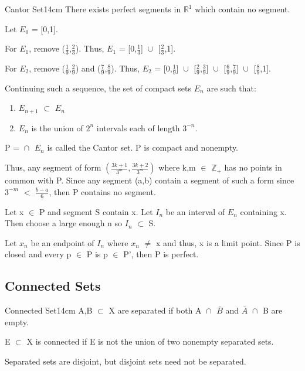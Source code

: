 	\begin{definition}{Cantor Set}{14cm}
		There exists perfect segments in $\mathbb{R}^1$ which contain no segment.

		Let $E_0$ = [0,1].

		For $E_1$, remove ($\frac{1}{3}$,$\frac{2}{3}$).
		Thus, $E_1$ = [0,$\frac{1}{3}$] $\cup_{}^{}$ [$\frac{2}{3}$,1].

		For $E_2$, remove ($\frac{1}{9}$,$\frac{2}{9}$) and ($\frac{7}{9}$,$\frac{8}{9}$).
		Thus, $E_2$ = [0,$\frac{1}{9}$] $\cup_{}^{}$ [$\frac{2}{9}$,$\frac{3}{9}$] $\cup_{}^{}$
		[$\frac{6}{9}$,$\frac{7}{9}$] $\cup_{}^{}$ [$\frac{8}{9}$,1].

		Continuing such a sequence, the set of compact sets $E_n$ are such that:

		\begin{enumerate}[label=(\alph*), leftmargin=2cm, itemsep=0.1cm]
			\item $E_{n+1}$ $\subset$ $E_n$
			\item $E_n$ is the union of $2^n$ intervals each of length $3^{-n}$.
		\end{enumerate}

		P = $\cap_{}^{}$ $E_n$ is called the Cantor set.
		P is compact and nonempty.

		Thus, any segment of form $(\frac{3k+1}{3^m},\frac{3k+2}{3^m})$
		where k,m $\in$ $\mathbb{Z}_+$ has no points in common with P.
		Since any segment (a,b) contain a segment of such a form since
		$3^{-m}$ $<$ $\frac{b-a}{6}$, then P contains no segment.

		Let x $\in$ P and segment S contain x. Let $I_n$ be an interval of
		$E_n$ containing x. Then choose a large enough n so $I_n$ $\subset$ S.
		
		Let $x_n$ be an endpoint of $I_n$ where $x_n$ $\not =$ x and thus,
		x is a limit point. Since P is closed and every p $\in$ P is p $\in$ P',
		then P is perfect.
	\end{definition}
	
	\vspace{0.5cm}





\subsection{ Connected Sets }

	\begin{definition}{Connected Set}{14cm}
		A,B $\subset$ X are separated if both
		A $\cap_{}^{}$ $\overline{B}$ and
		$\overline{A}$ $\cap_{}^{}$ B are empty.

		E $\subset$ X is connected if E is not the union of two nonempty
		separated sets.

		Separated sets are disjoint, but disjoint sets need not be separated.
	\end{definition}

